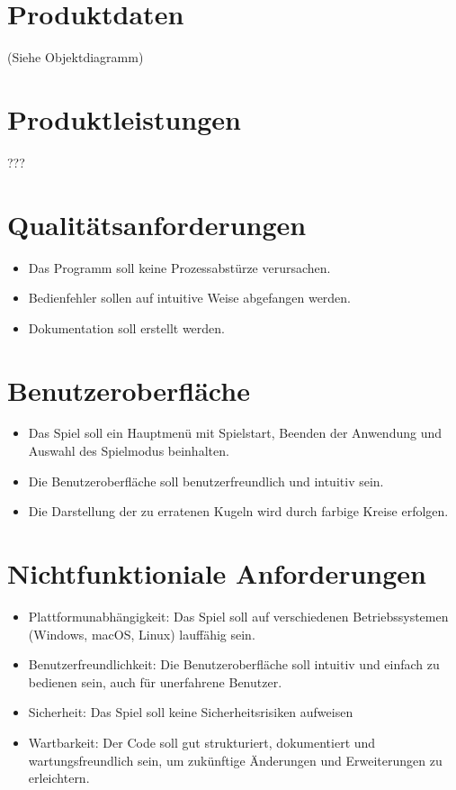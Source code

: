 \documentclass[paper=a4,fontsize=11pt,DIV14]{scrartcl}%
\numberwithin{equation}{section}
\begin{document}
\section{Produktdaten}
(Siehe Objektdiagramm)
\section{Produktleistungen}
???
\section{Qualitätsanforderungen}
\begin{itemize}
    \item Das Programm soll keine Prozessabstürze verursachen.
    \item Bedienfehler sollen auf intuitive Weise abgefangen werden.
    \item Dokumentation soll erstellt werden.
\end{itemize}
\section{Benutzeroberfläche}
\begin{itemize}
    \item Das Spiel soll ein Hauptmenü mit Spielstart, Beenden der Anwendung und Auswahl des Spielmodus beinhalten.
    \item Die Benutzeroberfläche soll benutzerfreundlich und intuitiv sein.
    \item Die Darstellung der zu erratenen Kugeln wird durch farbige Kreise erfolgen.
\end{itemize}
\section{Nichtfunktioniale Anforderungen}
\begin{itemize}
    \item Plattformunabhängigkeit: Das Spiel soll auf verschiedenen Betriebssystemen (Windows, macOS, Linux) lauffähig sein.
    \item Benutzerfreundlichkeit: Die Benutzeroberfläche soll intuitiv und einfach zu bedienen sein, auch für unerfahrene Benutzer.
    \item Sicherheit: Das Spiel soll keine Sicherheitsrisiken aufweisen
    \item Wartbarkeit: Der Code soll gut strukturiert, dokumentiert und wartungsfreundlich sein, um zukünftige Änderungen und Erweiterungen zu erleichtern.
\end{itemize}
\end{document}
